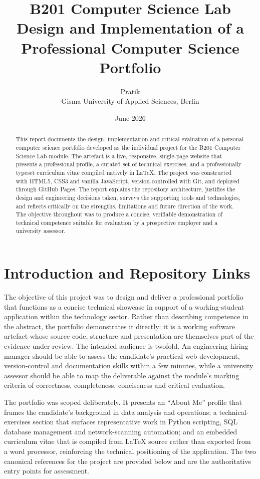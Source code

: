 \documentclass[11pt,a4paper]{article}
\title{\vspace{-1.2cm}\bfseries B201 Computer Science Lab\\[4pt]
\large Design and Implementation of a Professional Computer Science Portfolio}
\author{Pratik\\ \small Gisma University of Applied Sciences, Berlin}
\date{\small June 2026}
\begin{document}
\maketitle
\thispagestyle{fancy}
\vspace{-0.6cm}

\begin{abstract}
\noindent This report documents the design, implementation and critical evaluation of a personal computer science portfolio developed as the individual project for the B201 Computer Science Lab module. The artefact is a live, responsive, single-page website that presents a professional profile, a curated set of technical exercises, and a professionally typeset curriculum vitae compiled natively in \LaTeX. The project was constructed with HTML5, CSS3 and vanilla JavaScript, version-controlled with Git, and deployed through GitHub Pages. The report explains the repository architecture, justifies the design and engineering decisions taken, surveys the supporting tools and technologies, and reflects critically on the strengths, limitations and future direction of the work. The objective throughout was to produce a concise, verifiable demonstration of technical competence suitable for evaluation by a prospective employer and a university assessor.
\end{abstract}

\section{Introduction and Repository Links}
The objective of this project was to design and deliver a professional portfolio that functions as a concise technical showcase in support of a working-student application within the technology sector. Rather than describing competence in the abstract, the portfolio demonstrates it directly: it is a working software artefact whose source code, structure and presentation are themselves part of the evidence under review. The intended audience is twofold. An engineering hiring manager should be able to assess the candidate's practical web-development, version-control and documentation skills within a few minutes, while a university assessor should be able to map the deliverable against the module's marking criteria of correctness, completeness, conciseness and critical evaluation.

The portfolio was scoped deliberately. It presents an ``About Me'' profile that frames the candidate's background in data analysis and operations; a technical-exercises section that surfaces representative work in Python scripting, SQL database management and network-scanning automation; and an embedded curriculum vitae that is compiled from \LaTeX{} source rather than exported from a word processor, reinforcing the technical positioning of the application. The two canonical references for the project are provided below and are the authoritative entry points for assessment.
\end{document}
